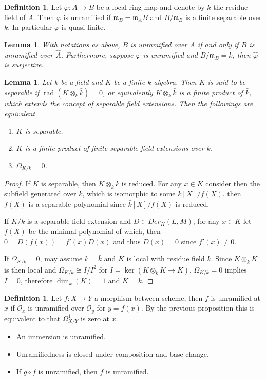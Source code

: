 \documentclass[leqno]{amsart}
\DeclareMathOperator{\rad}{rad}
\newcommand{\oo}{\mathcal O}
\newcommand{\1}{\mathbf{1}}
\newcommand{\fm}{\mathfrak m}
\newtheorem{lem}[thm]{Lemma}
\theoremstyle{definition}
\newtheorem{defn}[thm]{Definition}
\theoremstyle{remark}
\begin{document}
\begin{defn}
	Let $\varphi\colon A\to B$ be a local ring map
	and denote by $k$ the residue field of $A$.
	Then  $\varphi$ is unramified if 
	$\fm_B=\fm_AB$ and  $B/\fm_B$ is a 
	finite separable over $k$.
	In particular $\varphi$ is quasi-finite.
\end{defn}
\begin{lem}\label{lem:unramified_completion}
	With notations as above,
	$B$ is unramified over  $A$
	if and only if 
	$\hat{B}$ is unramified over $\hat{A}$.
	Furthermore, suppose $\varphi$ is unramified
	and  $B/\fm_B=k$,
	then $\hat{\varphi}$ is surjective.
\end{lem}
\begin{lem}
	Let $k$ be a field and 
	$K$ be a finite  $k$-algebra.
	Then $K$ is said to be separable 
	if  $\rad(K\otimes_k\bar{k})=0$, or equivalently
	$K\otimes_k\bar{k}$ is a finite product of $\bar{k}$,
	which extends the concept of separable field extensions.
	Then the followings are equivalent.
	\begin{enumerate}[label=(\alph*)]
		\item $K$ is separable.
		\item  $K$ is a finite product of finite separable
			field extensions over  $k$.
		\item  $\Omega_{K/k}=0$.
	\end{enumerate}
\end{lem}
\begin{proof}
	If $K$ is separable, then $K\otimes_k\bar{k}$ is reduced.
	For any $x\in K$ consider then
	the subfield generated over $k$,
	which is isomorphic to some $k[X]/f(X)$.
	then $f(X)$ is a separable polynomial 
	since $\bar{k}[X]/f(X)$ is reduced.

	If $K/k$ is a separable field extension
	and  $D\in Der_K(L,M)$,
	for any  $x\in K$ let $f(X)$ be the minimal polynomial 
	of which,
	then  $0=D(f(x))=f'(x)D(x)$
	and thus $D(x)=0$ since $f'(x)\neq 0$.

	If $\Omega_{K/k}=0$, may assume $k=\bar{k}$ 
	and $K$ is local with residue field  $k$.
	Since $K\otimes_kK$ is then local 
	and  $\Omega_{K/k}\cong I/I^2$
	for $I=\ker(K\otimes_kK\to K)$,
	$\Omega_{K/k}=0$ implies $I=0$,
	therefore $\dim_k(K)=1$  and $K=k$.
\end{proof}

\begin{defn}
	Let  $f\colon X\to Y$ a morphism between scheme,
	then $f$ is unramified at  $x$
	if $\oo_x$ is unramified over $\oo_y$ for $y=f(x)$.
	By the previous proposition 
	this is equivalent to that 
	$\Omega^1_{X/Y}$ is zero at $x$.
\begin{itemize}
	\item An immersion is unramified.
	\item Unramifiedness is closed under composition
		and base-change.
	\item If $g\circ f$ is unramified,
		then $f$ is unramified.
\end{itemize}
\end{defn}
\end{document}
